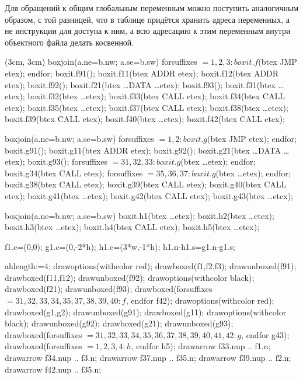 Для обращений к общим глобальным переменным можно поступить аналогичным образом, с той разницей, что в таблице придётся хранить адреса переменных, а не инструкции для доступа к ним, а всю адресацию к этим переменным внутри объектного файла делать косвенной.

\begin{empdef}[inmemory](3cm, 3cm)
    boxjoin(a.ne=b.nw; a.se=b.sw)
    forsuffixes $=1,2,3:
        boxit.f$(btex JMP etex);
    endfor;
    boxit.f91();
    boxit.f11(btex ADDR etex);
    boxit.f12(btex ADDR etex);
    boxit.f92();
    boxit.f21(btex \dots DATA \dots etex);
    boxit.f93();
    boxit.f31(btex \dots etex);
    boxit.f32(btex \dots etex);
    boxit.f33(btex CALL etex);
    boxit.f34(btex CALL etex);
    boxit.f35(btex \dots etex);
    boxit.f37(btex CALL etex);
    boxit.f38(btex \dots etex);
    boxit.f39(btex CALL etex);
    boxit.f40(btex \dots etex);
    boxit.f42(btex CALL etex);

    boxjoin(a.ne=b.nw; a.se=b.sw)
    forsuffixes $=1,2:
        boxit.g$(btex JMP etex);
    endfor;
    boxit.g91();
    boxit.g11(btex ADDR etex);
    boxit.g92();
    boxit.g21(btex \dots DATA \dots etex);
    boxit.g93();
    forsuffixes $=31,32,33:
        boxit.g$(btex \dots etex);
    endfor;
    boxit.g34(btex CALL etex);
    forsuffixes $=35,36,37:
        boxit.g$(btex \dots etex);
    endfor;
    boxit.g38(btex CALL etex);
    boxit.g39(btex CALL etex);
    boxit.g40(btex CALL etex);
    boxit.g41(btex \dots etex);
    boxit.g42(btex CALL etex);
    boxit.g43(btex \dots etex);

    boxjoin(a.ne=b.nw; a.se=b.sw)
    boxit.h1(btex \dots etex);
    boxit.h2(btex \dots etex);
    boxit.h3(btex \dots etex);
    boxit.h4(btex CALL etex);
    boxit.h5(btex \dots etex);

    f1.c=(0,0);
    g1.c=(0,-2*h);
    h1.c=(3*w,-1*h);
    h1.n-h1.s=g1.n-g1.s;

    ahlength:=4;
    drawoptions(withcolor red);
    drawboxed(f1,f2,f3);
    drawunboxed(f91);
    drawboxed(f11,f12);
    drawunboxed(f92);
    drawoptions(withcolor black);
    drawboxed(f21);
    drawunboxed(f93);
    drawboxed(forsuffixes $=31,32,33,34,35,37,38,39,40: f$, endfor f42);
    drawoptions(withcolor red);
    drawboxed(g1,g2);
    drawunboxed(g91);
    drawboxed(g11);
    drawoptions(withcolor black);
    drawunboxed(g92);
    drawboxed(g21);
    drawunboxed(g93);
    drawboxed(forsuffixes $=31,32,33,34,35,36,37,38,39,40,41,42: g$, endfor g43);
    drawboxed(forsuffixes $=1,2,3,4: h$, endfor h5);
    drawarrow f33.n{up} .. f1.n;
    drawarrow f34.n{up} .. f3.n;
    drawarrow f37.n{up} .. f35.n;
    drawarrow f39.n{up} .. f2.n;
    drawarrow f42.n{up} .. f35.n;
    

\end{empdef}
